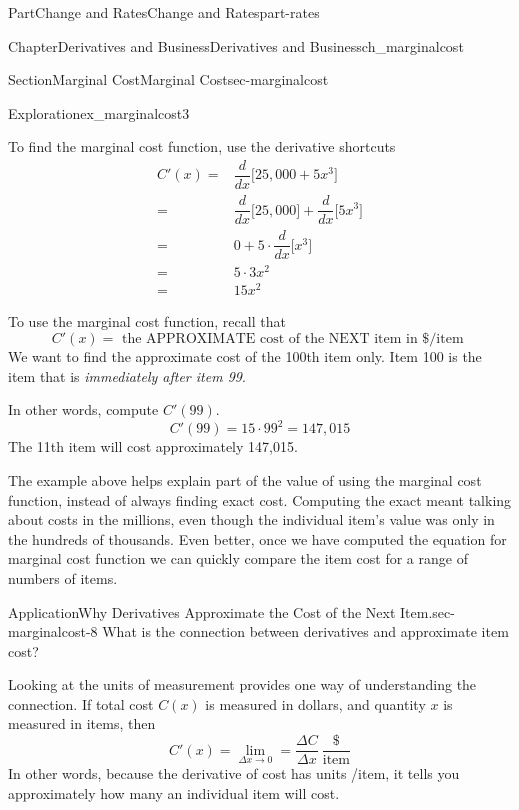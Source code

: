 \documentclass[oneside,10pt,]{tufte-book}
\numberwithin{equation}{chapter}
\newcommand{\ddx}[1]{ \dfrac{d}{dx} \Big[ #1 \Big]  }
\newcommand{\amp}{&}
\begin{document}
\begin{partptx}{Part}{Change and Rates}{}{Change and Rates}{}{}{part-rates}
\begin{chapterptx}{Chapter}{Derivatives and Business}{}{Derivatives and Business}{}{}{ch_marginalcost}
\begin{sectionptx}{Section}{Marginal Cost}{}{Marginal Cost}{}{}{sec-marginalcost}
\begin{exploration}{Exploration}{}{ex_marginalcost3}
\begin{enumerate}[font=\bfseries,label=(\alph*),ref=\alph*]
\par
To find the marginal cost function, use the derivative shortcuts%
\begin{align*}
C'(x) = \amp \ddx{ 25,000 + 5x^3 }\\
= \amp \ddx{25,000} + \ddx{5x^3}\\
= \amp 0 + 5\cdot \ddx{x^3}\\
= \amp 5 \cdot 3x^2\\
= \amp 15 x^2
\end{align*}
%
\par
To use the marginal cost function, recall that%
\begin{equation*}
C'(x) = \text{ the APPROXIMATE cost of the NEXT item in \$/item }
\end{equation*}
We want to find the approximate cost of the 100th item only. Item 100 is the item that is \emph{immediately after item 99}.%
\par
In other words, compute \(C'(99)\).%
\begin{equation*}
C'(99) = 15 \cdot 99^2 = 147,015
\end{equation*}
The 11th item will cost approximately \textdollar{}147,015.%
\end{enumerate}%
\end{exploration}%
The example above helps explain part of the value of using the marginal cost function, instead of always finding exact cost. Computing the exact meant talking about costs in the millions, even though the individual item's value was only in the hundreds of thousands. Even better, once we have computed the equation for marginal cost function we can quickly compare the item cost for a range of numbers of items.%
\begin{insight}{Application}{Why Derivatives Approximate the Cost of the Next Item.}{sec-marginalcost-8}%
What is the connection between derivatives and approximate item cost?%
\par
Looking at the units of measurement provides one way of understanding the connection.  If total cost \(C(x)\) is measured in dollars, and quantity \(x\) is measured in items, then%
\begin{equation*}
C'(x) = \lim_{\Delta x\rightarrow 0} = \dfrac{\Delta C}{\Delta x} \ \dfrac{\text{\$}}{\text{item}} 
\end{equation*}
In other words, because the derivative of cost has units \textdollar{}\slash{}item, it tells you approximately how many \textdollar{} an individual item will cost.%
\par

\end{insight}
\end{sectionptx}
\end{chapterptx}
\end{partptx}
\end{document}
